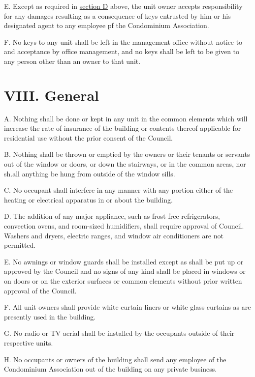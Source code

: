 \documentclass[
]{book}
\begin{document}
E. Except as required in \protect\hyperlink{Sect4D}{section D} above, the unit owner accepts responsibility for any damages resulting as a consequence of keys entrusted by him or his designated agent to any employee pf the Condominium Association.

F. No keys to any unit shall be left in the management office without notice to and acceptance by office management, and no keys shall be left to be given to any person other than an owner to that unit.

\hypertarget{viii.-general}{%
\section*{VIII. General}\label{viii.-general}}

A. Nothing shall be done or kept in any unit in the common elements which will increase the rate of insurance of the building or contents thereof applicable for residential use without the prior consent of the Council.

B. Nothing shall be thrown or emptied by the owners or their tenants or servants out of the window or doors, or down the stairways, or in the common areas, nor sh.all anything be hung from outside of the window sills.

C. No occupant shall interfere in any manner with any portion either of the heating or electrical apparatus in or about the building.

D. The addition of any major appliance, such as frost-free refrigerators, convection ovens, and room-sized humidifiers, shall require approval of Council. Washers and dryers, electric ranges, and window air conditioners are not permitted.

E. No awnings or window guards shall be installed except as shall be put up or approved by the Council and no signs of any kind shall be placed in windows or on doors or on the exterior surfaces or common elements without prior written approval of the Council.

F. All unit owners shall provide white curtain liners or white glass curtains as are presently used in the building.

G. No radio or TV aerial shall be installed by the occupants outside of their respective units.

H. No occupants or owners of the building shall send any employee of the Condominium Association out of the building on any private business.
\end{document}
